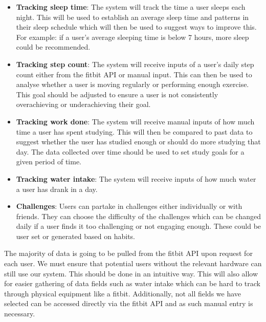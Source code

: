 \documentclass[12pt]{article}
\begin{document}
\begin{itemize}

    \item \textbf{Tracking sleep time}: The system will track the time a user
        sleeps each night. This will be used to establish an average sleep time
        and patterns in their sleep schedule which will then be used to suggest
        ways to improve this. For example: if a user's average sleeping time is
        below 7 hours, more sleep could be recommended.
    
    \item \textbf{Tracking step count}: The system will receive inputs of a user's daily
        step count either from the fitbit API or manual input. This can then be
        used to analyse whether a user is moving regularly or performing enough
        exercise. This goal should be adjusted to ensure a user is not
        consistently overachieving or underachieving their goal.

    \item \textbf{Tracking work done}: The system will receive manual inputs of how much
        time a user has spent studying. This will then be compared to past data
        to suggest whether the user has studied enough or should do more
        studying that day. The data collected over time should be used to set
        study goals for a given period of time.
    
    \item \textbf{Tracking water intake}: The system will receive inputs of how much
        water a user has drank in a day.

    \item \textbf{Challenges}: Users can partake in challenges either individually or
        with friends. They can choose the difficulty of the challenges which
        can be changed daily if a user finds it too challenging or not engaging
        enough. These could be user set or generated based on habits. 

\end{itemize}

 The majority of data is going to be pulled from the fitbit API upon request for each user. We must ensure that potential users without the relevant hardware can still use our system. This should be done in an intuitive way. This will also allow for easier gathering of data fields such as water intake which can be hard to track through physical equipment like a fitbit. Additionally, not all fields we have selected can be accessed directly via the fitbit API and as such manual entry is necessary.\newline
\end{document}
